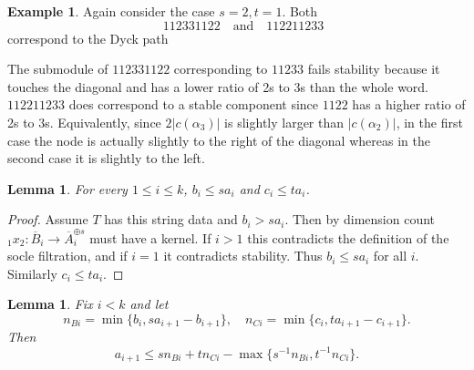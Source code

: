 \documentclass{amsart}
\numberwithin{equation}{section}
\numberwithin{figure}{section}
\numberwithin{table}{section}
\newtheorem{Lemma}[equation]{Lemma}
\theoremstyle{definition}
\newtheorem{Example}[equation]{Example}
\begin{document}
\begin{Example} Again consider the case $s=2,t=1$. Both
$$\quad 112331122  \quad \text{and} \quad 112211233 $$
correspond to the Dyck path
\begin{center}
\end{center}
The submodule of $112331122$ corresponding to $11233$ fails stability because it touches the diagonal and has a lower ratio of 2s to 3s than the whole word. 
 $112211233$ does correspond to a stable component since $1122$ has a higher ratio of 2s to 3s. Equivalently, since $2|c(\alpha_3)|$ is slightly larger than $|c(\alpha_2)|$, in the first case the node is actually slightly to the right of the diagonal whereas in the second case it is slightly to the left. 
\end{Example}


\begin{Lemma} \label{lem:main3easy} For every $1 \leq i \leq k$, 
$b_i \leq sa_i$ and  $c_i \leq ta_i$.
\end{Lemma}


\begin{proof}
Assume $T$ has this string data and $b_i>sa_i$. Then by dimension count ${}_1x_2: \overline B_i \rightarrow \overline A_i^{\oplus s}$ must have a kernel. If $i>1$ this contradicts the definition of the socle filtration, and if $i=1$ it contradicts stability. Thus $b_i \leq sa_i$  for all $i$. Similarly  $c_i \leq ta_i$.  
\end{proof}

\begin{Lemma}   \label{lem:mainn}
Fix $i<k$ and let
$$n_{Bi}=  \min \{ b_i, s a_{i+1}-b_{i+1}\}, \quad n_{Ci}=  \min \{ c_i, t a_{i+1}-c_{i+1}\}.$$
Then 
 $$a_{i+1} \leq s n_{Bi}+tn_{Ci}- \max \{s^{-1} n_{Bi}, t^{-1} n_{Ci} \}.$$ 
\end{Lemma}
\end{document}
